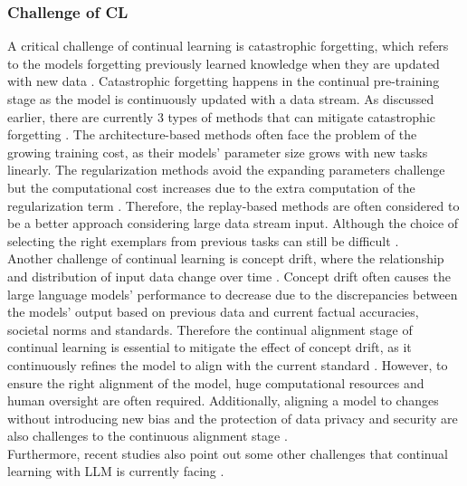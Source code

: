\documentclass[runningheads]{llncs}
\begin{document}
\subsubsection{Challenge of CL}
\noindent \newline
A critical challenge of continual learning is catastrophic forgetting, which refers to the models forgetting previously learned knowledge 
when they are updated with new data \cite{Gupta23}. Catastrophic forgetting happens in the continual pre-training stage as the model is continuously updated with a data stream.
As discussed earlier, there are currently 3 types of methods that can mitigate catastrophic forgetting \cite{Shi24}. The architecture-based methods often face the problem of the growing 
training cost, as their models' parameter size grows with new tasks linearly\cite{Jovanov}. The regularization methods avoid the expanding parameters challenge but the computational cost
increases due to the extra computation of the regularization term \cite{Wang24}. Therefore, the replay-based methods are often considered to be
a better approach considering large data stream input. Although the choice of selecting the right exemplars from previous tasks can still be difficult \cite{Jovanov}. \\
\noindent \newline
Another challenge of continual learning is concept drift, where the relationship and distribution of input data change over time \cite{Biesi20}. Concept drift often causes the large language models' performance to decrease
due to the discrepancies between the models' output based on previous data and current factual accuracies, societal norms and standards. Therefore the continual alignment stage of continual learning is essential to 
mitigate the effect of concept drift, as it continuously refines the model to align with the current standard \cite{Taori23}.
However, to ensure the right alignment of the model, huge computational resources and human oversight are often required. Additionally, aligning a model to changes without introducing new bias and the protection of data
privacy and security are also challenges to the continuous alignment stage \cite{Shi24}. \\
\noindent \newline
Furthermore, recent studies also point out some other challenges that continual learning with LLM is currently facing \cite{Yang24}.
\end{document}
